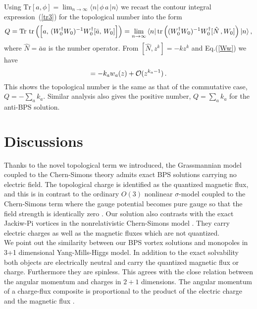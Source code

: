 \documentclass[a4paper,12pt]{article}
\def\tr{{\mbox{\,tr}}}
\def\Tr{{\mbox{Tr}}}
\begin{document}
Using  $\Tr [a,\phi]=\lim_{n\rightarrow\infty}\langle n|\,\phi\,a\,|n\rangle$ we recast
the contour integral expression~(\ref{tr3}) for the topological number into the form
\begin{equation}
Q=\Tr\,\tr\left(\left[a,\,(W^{\dagger}_{0}W_{0})^{-1}W^{\dagger}_{0}[\bar{a},\,
W_{0}]\right]\right)
=\displaystyle{\lim_{n\rightarrow\infty}}\,\langle
n|\tr\left((W^{\dagger}_{0}W_{0})^{-1}W^{\dagger}_{0}[\hat{N}\,,
W_{0}]\right)|n\rangle\,,
\end{equation}
where $\hat{N}=\bar{a}a$ is the number operator. From
$[\hat{N},z^{k}]=-kz^{k}$ and Eq.(\ref{Ww}) we have
\begin{equation}
[\hat{N},w_{a}(z)]=-k_{a}w_{a}(z)+{\cal O}(z^{k_{a}-1})\,.
\end{equation}
This  shows the topological number is the same as that of the commutative
case, $Q=-\sum_{a} k_{a}$. Similar analysis also gives the positive number,
$Q=\sum_{a} k_{a}$ for the anti-BPS solution.

\section{Discussions}
Thanks to the novel topological term we introduced,
the Grassmannian model coupled to the Chern-Simons theory
admits exact BPS solutions carrying no electric field. The
topological charge is identified as the quantized magnetic flux, and
this is in contrast to the ordinary
 $O(3)$ nonlinear $\sigma$-model coupled to the Chern-Simons term \cite{nard} where
the gauge potential becomes pure gauge so that the field strength is identically zero \cite{twoform}. Our solution
also contrasts with the exact Jackiw-Pi vortices in the nonrelativistic Chern-Simons model \cite{jackiw}.  They
carry electric charges as well as  the magnetic fluxes which are not quantized. \\





We point out  the  similarity between our BPS vortex solutions and monopoles  in 3+1 dimensional Yang-Mills-Higgs
model. In addition to the exact solvability both objects are electrically neutral and carry the quantized magnetic
flux or charge. Furthermore they are spinless.     This agrees with the close relation between the angular
momentum and charges in $2+1$ dimensions. The angular momentum  of a charge-flux composite is proportional to the
product of the electric charge and the magnetic flux \cite{wilczek}.\\
\end{document}
